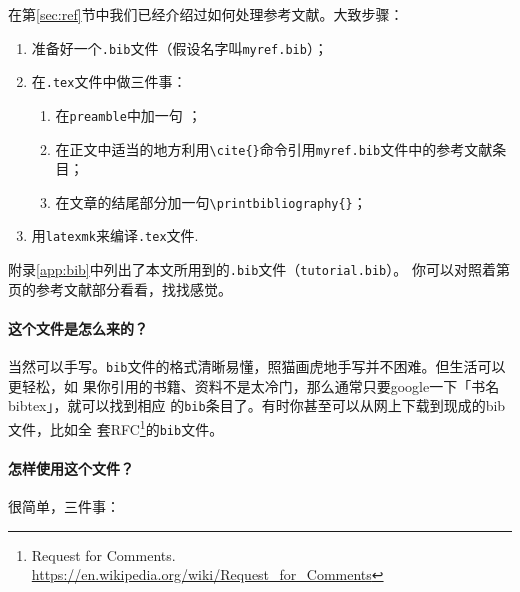 在第\ref{sec:ref}节中我们已经介绍过如何处理参考文献。大致步骤：
\begin{enumerate}
\item 准备好一个\texttt{.bib}文件（假设名字叫\texttt{myref.bib}）；
\item 在\texttt{.tex}文件中做三件事：
  \begin{enumerate}
  \item 在\texttt{preamble}中加一句 \verb||；
  \item 在正文中适当的地方利用\verb|\cite{}|命令引用\texttt{myref.bib}文件中的参考文献条目；
  \item 在文章的结尾部分加一句\verb|\printbibliography{}|；
  \end{enumerate}
\item 用\texttt{latexmk}来编译\texttt{.tex}文件.
\end{enumerate}

附录\ref{app:bib}中列出了本文所用到的\texttt{.bib}文件（\texttt{tutorial.bib}）。
你可以对照着第\pageref{p:ref}页的参考文献部分看看，找找感觉。

\paragraph*{这个文件是怎么来的？}

当然可以手写。\texttt{bib}文件的格式清晰易懂，照猫画虎地手写并不困难。但生活可以更轻松，如
果你引用的书籍、资料不是太冷门，那么通常只要google一下「书名 bibtex」，就可以找到相应
的\texttt{bib}条目了。有时你甚至可以从网上下载到现成的bib文件，比如全
套RFC\footnote{Request for
  Comments. \url{https://en.wikipedia.org/wiki/Request_for_Comments}}的\texttt{bib}文件。

\paragraph*{怎样使用这个文件？}

很简单，三件事：

